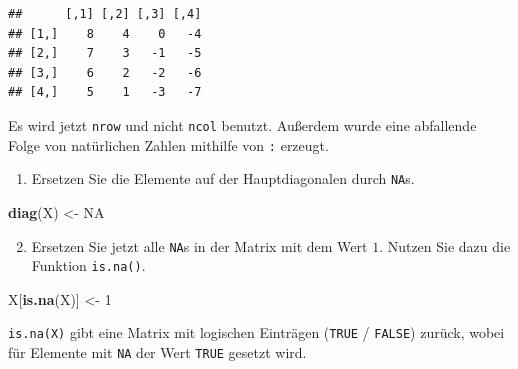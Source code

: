\documentclass[12pt,a4paper]{article}
\newenvironment{Shaded}{\begin{snugshade}}{\end{snugshade}}
\newcommand{\ConstantTok}[1]{\textcolor[rgb]{0.56,0.35,0.01}{#1}}
\newcommand{\DecValTok}[1]{\textcolor[rgb]{0.00,0.00,0.81}{#1}}
\newcommand{\FunctionTok}[1]{\textcolor[rgb]{0.13,0.29,0.53}{\textbf{#1}}}
\newcommand{\NormalTok}[1]{#1}
\newcommand{\OtherTok}[1]{\textcolor[rgb]{0.56,0.35,0.01}{#1}}
\begin{document}
\begin{verbatim}
##      [,1] [,2] [,3] [,4]
## [1,]    8    4    0   -4
## [2,]    7    3   -1   -5
## [3,]    6    2   -2   -6
## [4,]    5    1   -3   -7
\end{verbatim}

Es wird jetzt \texttt{nrow} und nicht \texttt{ncol} benutzt. Außerdem
wurde eine abfallende Folge von natürlichen Zahlen mithilfe von
\texttt{:} erzeugt.

\begin{enumerate} 
  \item Ersetzen Sie die Elemente auf der Hauptdiagonalen durch \texttt{NA}s. 
\end{enumerate}

\begin{Shaded}
\begin{Highlighting}[]
    \FunctionTok{diag}\NormalTok{(X) }\OtherTok{\textless{}{-}} \ConstantTok{NA}
\end{Highlighting}
\end{Shaded}

\begin{enumerate} \setcounter{enumi}{1}
  \item Ersetzen Sie jetzt alle \texttt{NA}s in der Matrix mit dem Wert $1$. Nutzen Sie dazu die Funktion \texttt{is.na()}.
\end{enumerate}

\begin{Shaded}
\begin{Highlighting}[]
\NormalTok{    X[}\FunctionTok{is.na}\NormalTok{(X)] }\OtherTok{\textless{}{-}} \DecValTok{1}
\end{Highlighting}
\end{Shaded}

\texttt{is.na(X)} gibt eine Matrix mit logischen Einträgen
(\texttt{TRUE} / \texttt{FALSE}) zurück, wobei für Elemente mit
\texttt{NA} der Wert \texttt{TRUE} gesetzt wird.
\end{document}
